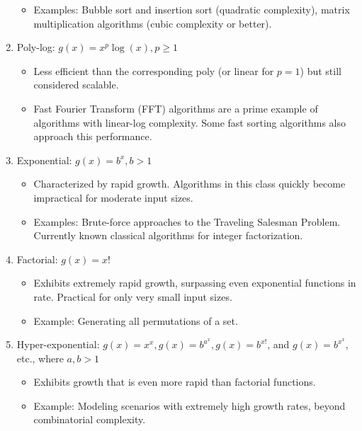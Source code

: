 \documentclass[12pt]{article}
\theoremstyle{definition}
\begin{document}
\begin{enumerate}
\begin{itemize}
        \item Examples: Bubble sort and insertion sort (quadratic complexity), matrix multiplication algorithms (cubic complexity or better).
    \end{itemize}
    
    \item Poly-log: $g(x) = x^p \log(x), p \geq 1$
    \begin{itemize}
        \item Less efficient than the corresponding poly (or linear for $p = 1$) but still considered scalable.
        
        \item Fast Fourier Transform (FFT) algorithms are a prime example of algorithms with linear-log complexity. Some fast sorting algorithms also approach this performance.
    \end{itemize}
    
    \item Exponential: $g(x) = b^x, b > 1$
    \begin{itemize}
        \item Characterized by rapid growth. Algorithms in this class quickly become impractical for moderate input sizes.
        
        \item Examples: Brute-force approaches to the Traveling Salesman Problem. Currently known classical algorithms for integer factorization.
    \end{itemize}
    
    \item Factorial: $g(x) = x!$
    \begin{itemize}
        \item Exhibits extremely rapid growth, surpassing even exponential functions in rate. Practical for only very small input sizes.
        
        \item Example: Generating all permutations of a set.
    \end{itemize}
    
    \item Hyper-exponential: $g(x) = x^x, g(x) = b^{a^x}, g(x) = b^{x!}$, and $g(x) = b^{x^x}$, etc., where $a, b > 1$
    \begin{itemize}
        \item Exhibits growth that is even more rapid than factorial functions.
        
        \item Example: Modeling scenarios with extremely high growth rates, beyond combinatorial complexity.
    \end{itemize}
\end{enumerate}
\end{document}
